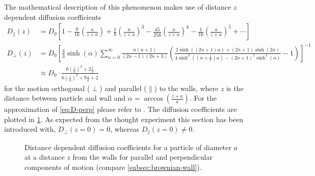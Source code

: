 \documentclass[.../bericht]{subfilies}
\begin{document}
        The mathematical description of this phenomenon makes use of distance $z$ dependent diffusion coefficients
        \begin{align}
          D_\parallel(z)&=D_0\left[ 1- \frac{9}{16} \left( \frac{a}{z+a}\right) + \frac{1}{8} \left( \frac{a}{z+a}\right)^3 - \frac{45}{256}\left( \frac{a}{z+a}\right)^4- \frac{1}{16}\left( \frac{a}{z+a}\right)^5+\cdots \right] \label{eq:D-parallel} \\
          D_\perp(z)&=D_0\left[ \frac{4}{3}\sinh (\alpha ) \sum_{n=0}^{\infty} \frac{n(n+1)}{(2n-1)(2n+3)}\left( \frac{2\sinh ((2n+1)\alpha )+(2n+1)\sinh (2\alpha )}{4\sinh^2 ((n+ \frac{1}{2})\alpha)-(2n+1)^2 \sinh^2 (\alpha )} - 1 \right) \right]^{-1} \nonumber \\
          &\approx D_0\cdot \frac{6 \left( \frac{z}{a}\right)^2 + 2 \frac{z}{a}}{6\left( \frac{z}{a}\right)^2 + 9 \frac{z}{a} + 2} \label{eq:D-perp}
        \end{align}
         for the motion orthogonal ($\perp$) and parallel ($\parallel$) to the walls, where $z$ is the distance between particle and wall and $\alpha=\arccos \left( \frac{z+a}{a} \right)$. For the approximation of \cref{eq:D-perp} please refer to \cite{beavan}. The diffusion coefficients are plotted in \cref{fig:D-wall}. As expected from the thought experiment this section has been introduced with, $D_\perp (z=0)=0$, whereas $D_\parallel (z=0)\ne 0$. \cite{helden}

         \begin{figure}
           \centering
           \caption{Distance dependent diffusion coefficients for a particle of diameter $a$ at a distance $z$ from the walls for parallel and perpendicular components of motion (compare \cref{subsec:brownian-wall}).}
           \label{fig:D-wall}
         \end{figure}
\end{document}
